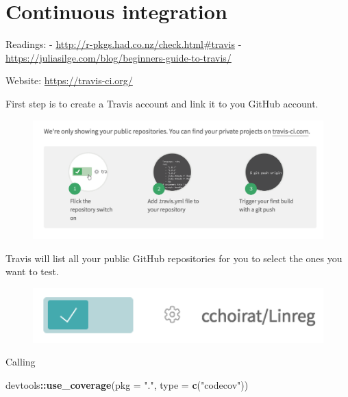 \documentclass[]{book}
\newenvironment{Shaded}{\begin{snugshade}}{\end{snugshade}}
\newcommand{\KeywordTok}[1]{\textcolor[rgb]{0.13,0.29,0.53}{\textbf{#1}}}
\newcommand{\DataTypeTok}[1]{\textcolor[rgb]{0.13,0.29,0.53}{#1}}
\newcommand{\StringTok}[1]{\textcolor[rgb]{0.31,0.60,0.02}{#1}}
\newcommand{\OperatorTok}[1]{\textcolor[rgb]{0.81,0.36,0.00}{\textbf{#1}}}
\newcommand{\NormalTok}[1]{#1}
\theoremstyle{definition}
\theoremstyle{definition}
\theoremstyle{definition}
\theoremstyle{remark}
\begin{document}
\section{Continuous integration}\label{continuous-integration}

Readings: - \url{http://r-pkgs.had.co.nz/check.html\#travis} -
\url{https://juliasilge.com/blog/beginners-guide-to-travis/}

Website: \url{https://travis-ci.org/}

First step is to create a Travis account and link it to you GitHub
account.

\begin{figure}

{\centering \includegraphics[width=14.38in]{images/ch3_travis_github} 

}

\end{figure}

Travis will list all your public GitHub repositories for you to select
the ones you want to test.

\begin{figure}

{\centering \includegraphics[width=5.39in]{images/ch3_travis_Linreg} 

}

\end{figure}

Calling

\begin{Shaded}
\begin{Highlighting}[]
\NormalTok{devtools}\OperatorTok{::}\KeywordTok{use_coverage}\NormalTok{(}\DataTypeTok{pkg =} \StringTok{"."}\NormalTok{, }\DataTypeTok{type =} \KeywordTok{c}\NormalTok{(}\StringTok{"codecov"}\NormalTok{))}
\end{Highlighting}
\end{Shaded}
\end{document}
